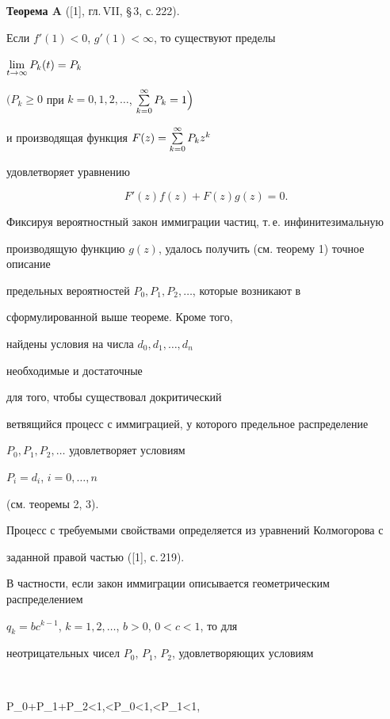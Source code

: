 {\bf Теорема A} ([1], гл.\,VII, \S\,3, с.\,222). {\it


Если $f'(1)<0$, $g'(1)<\infty$, то существуют пределы


$\lim \limits_ {t\to \infty }P_k(t)=P_k$


$\Big(P_k\geq 0$ при $k=0,1,2,\dotsc$, $\sum \limits_ {k=0}^{\infty }P_k=1\Big)$


и производящая функция $F(z)=\sum \limits_ {k=0}^{\infty }P_kz^k$


удовлетворяет уравнению


\begin{equation}


F'(z)f(z)+F(z)g(z)=0.


\end{equation}


}





Фиксируя вероятностный закон иммиграции частиц, т.\,е. инфинитезимальную


производящую функцию $g(z)$, удалось получить (см. теорему 1) точное описание


предельных вероятностей $P_0, P_1, P_2, \dotsc$, которые возникают в


сформулированной выше теореме. Кроме того,


найдены условия на числа $d_0, d_1, \dotsc, d_n$


необходимые и достаточные


для того, чтобы существовал докритический


ветвящийся процесс с иммиграцией, у которого предельное распределение


$P_0, P_1, P_2, \dotsc$ удовлетворяет условиям


$P_i=d_i$, $i=0, \dotsc,n$


(см. теоремы 2, 3).





Процесс с требуемыми свойствами определяется из уравнений Колмогорова с


заданной правой частью ([1], с.\,219).


В частности, если закон иммиграции описывается геометрическим распределением


$q_k=bc^{k-1}$, $k=1, 2, \dotsc$, $b>0$, $0<c<1$, то для


неотрицательных чисел $P_0$, $P_1$, $P_2$, удовлетворяющих условиям


$$


P_0+P_1+P_2<1,<P_0<1,<P_1<1,


